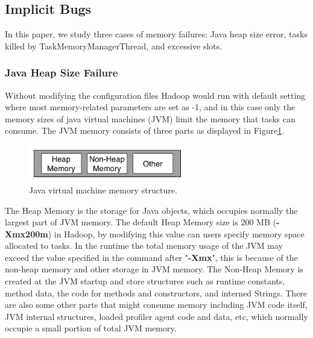 \subsection{Implicit Bugs}
In this paper, we study three cases of memory failures: Java heap size error, tasks killed by TaskMemoryManagerThread, and excessive slots.
\subsubsection{Java Heap Size Failure}
Without modifying the configuration files Hadoop would run with default setting where most memory-related parameters are set as -1, and in this case only the memory sizes of java virtual machines (JVM) limit the memory that tasks can consume.
The JVM memory consists of three parts as displayed in Figure\ref{ref:heap_structure}.
\par
\begin{figure}[ht]
  \centering
    \includegraphics[width=2.7in]{image/Jvm_Heap.png}
    \caption{Java virtual machine memory structure.}
    \label{ref:heap_structure}
\end{figure}
The Heap Memory is the storage for Java objects, which occupies normally the largest part of JVM memory. The default Heap Memory size is 200 MB ({\bf -Xmx200m}) in Hadoop, by modifying this value can users specify memory space allocated to tasks.
In the runtime the total memory usage of the JVM may exceed the value specified in the command after "{\bf -Xmx}", this is because of the non-heap memory and other storage in JVM memory.
The Non-Heap Memory  is created at the JVM startup and store structures such as runtime constants, method data, the code for methods and constructors, and interned Strings.
There are also some other parts that might consume memory including JVM code itself, JVM internal structures, loaded profiler agent code and data, etc, which normally occupie a small portion of total JVM memory. 

